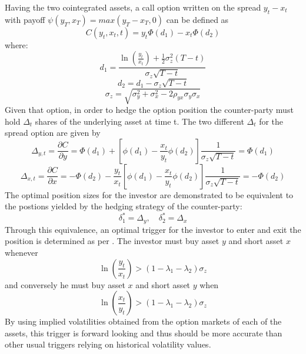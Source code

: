 Having the two cointegrated assets, a call option written on the spread $y_t - x_t$ with payoff $\psi(y_T, x_T)=max(y_T-x_T,0)$ can be defined as 
\begin{equation}
    C(y_t,x_t,t)=y_t \Phi(d_1)-x_t \Phi(d_2)
    \label{spread_option}
\end{equation}
where:
\begin{equation}
    \label{e:calc-d1}
    d_1=\frac{\ln\left(\frac{y_t}{x_t}\right)+\frac{1}{2}\sigma^2_z(T-t)}{\sigma_z \sqrt{T-t}}
\end{equation}
\begin{equation}
    d_2=d_1-\sigma_z \sqrt{T-t}
\end{equation}
\begin{equation}
    \sigma_z=\sqrt{\sigma_y^2+ \sigma_x^2-2\rho_{yx}\sigma_y\sigma_x}
\end{equation}
Given that option, in order to hedge the option position the counter-party must hold $\Delta_t$ shares of the underlying asset at time t. The two different $\Delta_t$ for the spread option are given by 
\begin{equation}
    \label{e:position-size-model-1}
    \Delta_{y,t} = \frac{\partial C}{\partial y} = \Phi(d_1)+\left[\phi(d_1)-\frac{x_t}{y_t}\phi(d_2)\right] \frac{1}{\sigma_z \sqrt{T-t}}=\Phi(d_1)
\end{equation}
\begin{equation}
    \label{e:position-size-model-2}
    \Delta_{x,t} = \frac{\partial C}{\partial x} = -\Phi(d_2)-\frac{y_t}{x_t}\left[\phi(d_1)-\frac{x_t}{y_t}\phi(d_2)\right] \frac{1}{\sigma_z \sqrt{T-t}}=-\Phi(d_2)
\end{equation}
The optimal position sizes for the investor are demonstrated to be equivalent to the postions yielded by the hedging strategy of the counter-party:
\begin{equation}
    \label{e:position-sizes}
    \delta^*_1=\Delta_y,\quad \delta^*_2=\Delta_x
\end{equation}
Through this equivalence, an optimal trigger for the investor to enter and exit the position is determined as per \cite{paraskevopoulos_2018}. The investor must buy asset $y$ and short asset $x$ whenever 
\begin{equation}
    \label{e:trigger-1}
    \ln\left(\frac{y_t}{x_t}\right) > (1-\lambda_1 - \lambda_2)\sigma_z
\end{equation}
and conversely he must buy asset $x$ and short asset $y$ when
\begin{equation}
    \ln\left(\frac{x_t}{y_t}\right) > (1-\lambda_1 - \lambda_2)\sigma_z
\end{equation}
By using implied volatilities obtained from the option markets of each of the assets, this trigger is forward looking and thus should be more accurate than other usual triggers relying on historical volatility values. 

